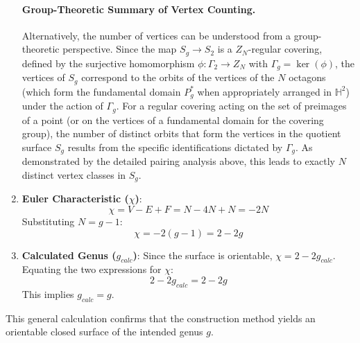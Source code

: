 \documentclass{article}
\theoremstyle{definition}
\theoremstyle{remark}
\begin{document}
\begin{enumerate}
    \paragraph{Group-Theoretic Summary of Vertex Counting.}
    Alternatively, the number of vertices can be understood from a group-theoretic perspective. Since the map $S_g \to S_2$ is a $Z_N$-regular covering, defined by the surjective homomorphism $\phi: \Gamma_2 \to Z_N$ with $\Gamma_g = \ker(\phi)$, the vertices of $S_g$ correspond to the orbits of the vertices of the $N$ octagons (which form the fundamental domain $P_g^*$ when appropriately arranged in $\mathbb{H}^2$) under the action of $\Gamma_g$. For a regular covering acting on the set of preimages of a point (or on the vertices of a fundamental domain for the covering group), the number of distinct orbits that form the vertices in the quotient surface $S_g$ results from the specific identifications dictated by $\Gamma_g$. As demonstrated by the detailed pairing analysis above, this leads to exactly $N$ distinct vertex classes in $S_g$.

    \item \textbf{Euler Characteristic ($\chi$)}:
    $$ \chi = V - E + F = N - 4N + N = -2N $$
    Substituting $N = g-1$:
    $$ \chi = -2(g-1) = 2 - 2g $$

    \item \textbf{Calculated Genus ($g_{calc}$)}:
    Since the surface is orientable, $\chi = 2 - 2g_{calc}$. Equating the two expressions for $\chi$:
    $$ 2 - 2g_{calc} = 2 - 2g $$
    This implies $g_{calc} = g$.
\end{enumerate}
This general calculation confirms that the construction method yields an orientable closed surface of the intended genus $g$.
\end{document}
